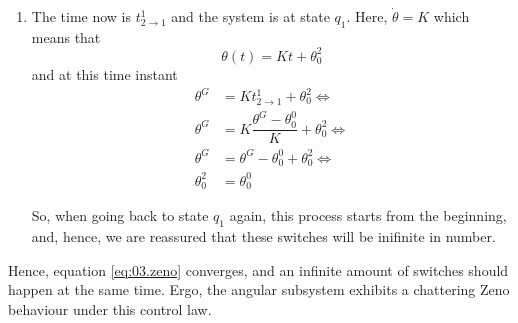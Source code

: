 \begin{enumerate}
    \item The time now is $t_{2\rightarrow1}^1$ and the system is at state $q_1$.
      Here, $\dot{\theta} = K$ which means that
      $$\theta(t) = K t + \theta_0^2$$
      and at this time instant
      \begin{align*}
        \theta^G &= K t_{2\rightarrow1}^1 + \theta_0^2 \Leftrightarrow \\
        \theta^G &= K \dfrac{\theta^G - \theta_0^0}{K} + \theta_0^2 \Leftrightarrow \\
        \theta^G &= \theta^G - \theta_0^0 + \theta_0^2 \Leftrightarrow \\
        \theta_0^2 &= \theta_0^0
      \end{align*}

      So, when going back to state $q_1$ again, this process starts from
      the beginning, and, hence, we are reassured that these switches will be
      inifinite in number.
\end{enumerate}

Hence, equation \ref{eq:03.zeno} converges, and an infinite amount of switches
should happen at the same time. Ergo, the angular subsystem exhibits a chattering
Zeno behaviour under this control law.


\begin{figure}[H]\centering
  \scalebox{0.9}{}
  \caption{}
  \label{fig:03}
\end{figure}
